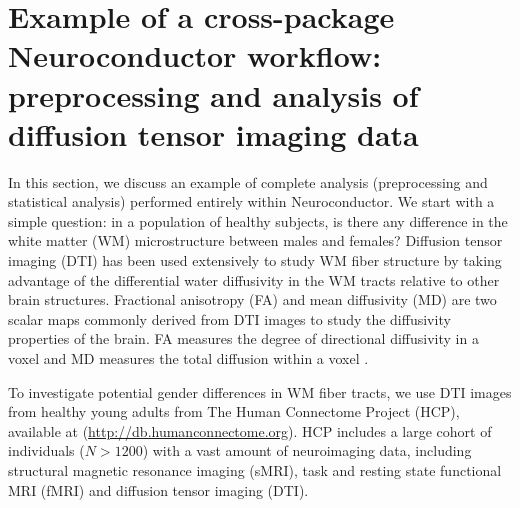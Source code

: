 \documentclass[]{elsarticle} %
\begin{document}
\section{Example of a cross-package Neuroconductor workflow: preprocessing and analysis of diffusion tensor imaging data}

In this section, we discuss an example of complete analysis (preprocessing and statistical analysis) performed entirely within Neuroconductor.  We start with a simple question: in a population of healthy subjects, is there any difference in the white matter (WM) microstructure between males and females? Diffusion tensor imaging (DTI) has been  used extensively to study WM fiber structure by taking advantage of the differential water diffusivity in the WM tracts relative to other brain structures. Fractional anisotropy (FA) and mean diffusivity (MD) are two scalar maps commonly derived from DTI images to study the diffusivity properties of the brain. FA measures the degree of directional diffusivity in a voxel and MD measures the total diffusion within a voxel \cite{fa}.

To investigate potential gender differences in WM fiber tracts, we use DTI images from healthy young adults from The Human Connectome Project (HCP), available at (\url{http://db.humanconnectome.org}).  HCP includes a large cohort of individuals ($N > 1200$) with a vast amount of neuroimaging data, including structural magnetic resonance imaging (sMRI), task and resting state functional MRI (fMRI) and diffusion tensor imaging (DTI).

\end{document}
